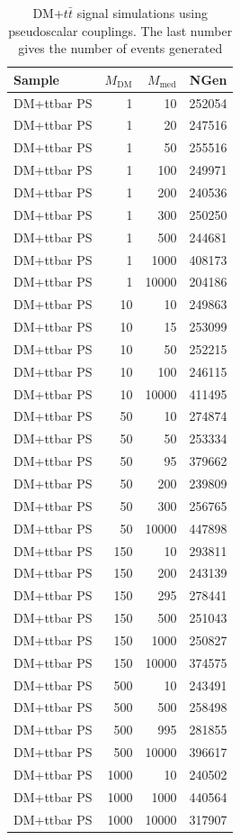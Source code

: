 \begin{table}[]
\centering
\begin{tabular}{lrrr}
\hline \hline
Sample & $M_{\text{DM}}$ & $M_{\text{med}}$ & NGen \\
\hline
DM+ttbar PS & 1    & 10    & 252054 \\
DM+ttbar PS & 1    & 20    & 247516 \\
DM+ttbar PS & 1    & 50    & 255516 \\
DM+ttbar PS & 1    & 100   & 249971 \\
DM+ttbar PS & 1    & 200   & 240536 \\
DM+ttbar PS & 1    & 300   & 250250 \\
DM+ttbar PS & 1    & 500   & 244681 \\
DM+ttbar PS & 1    & 1000  & 408173 \\
DM+ttbar PS & 1    & 10000 & 204186 \\
DM+ttbar PS & 10   & 10    & 249863 \\
DM+ttbar PS & 10   & 15    & 253099 \\
DM+ttbar PS & 10   & 50    & 252215 \\
DM+ttbar PS & 10   & 100   & 246115 \\
DM+ttbar PS & 10   & 10000 & 411495 \\
DM+ttbar PS & 50   & 10    & 274874 \\
DM+ttbar PS & 50   & 50    & 253334 \\
DM+ttbar PS & 50   & 95    & 379662 \\
DM+ttbar PS & 50   & 200   & 239809 \\
DM+ttbar PS & 50   & 300   & 256765 \\
DM+ttbar PS & 50   & 10000 & 447898 \\
DM+ttbar PS & 150  & 10    & 293811 \\
DM+ttbar PS & 150  & 200   & 243139 \\
DM+ttbar PS & 150  & 295   & 278441 \\
DM+ttbar PS & 150  & 500   & 251043 \\
DM+ttbar PS & 150  & 1000  & 250827 \\
DM+ttbar PS & 150  & 10000 & 374575 \\
DM+ttbar PS & 500  & 10    & 243491 \\
DM+ttbar PS & 500  & 500   & 258498 \\
DM+ttbar PS & 500  & 995   & 281855 \\
DM+ttbar PS & 500  & 10000 & 396617 \\
DM+ttbar PS & 1000 & 10    & 240502 \\
DM+ttbar PS & 1000 & 1000  & 440564 \\
DM+ttbar PS & 1000 & 10000 & 317907 \\
\hline \hline
\end{tabular}
\caption{DM+$t\bar{t}$ signal simulations using pseudoscalar couplings. The last number gives the number of events generated}
\label{tab:dmtt_ps}
\end{table}

